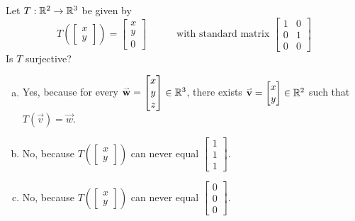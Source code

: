 \begin{activity}{3}
Let $T: \mathbb{R}^2 \rightarrow \mathbb{R}^3$ be given by
\[
  T\left(\begin{bmatrix}x \\ y \end{bmatrix} \right)
    =
  \begin{bmatrix} x \\ y \\ 0 \end{bmatrix}
    \hspace{3em}
    \text{with standard matrix }
  \begin{bmatrix} 1 & 0 \\ 0 & 1 \\ 0 & 0 \end{bmatrix}
\]
Is \(T\) surjective?
\begin{enumerate}[a)]
\item Yes, because for every \(\mathbf{\accentset{\rightharpoonup}{w}}=\begin{bmatrix}x\\y\\z\end{bmatrix}\in\mathbb{R}^3\),
there exists \(\mathbf{\accentset{\rightharpoonup}{v}}=\begin{bmatrix}x\\y\end{bmatrix}\in\mathbb{R}^2\) such that
\(T(\vec v)=\vec w\).
\item No, because 
  \(
    T\left(\begin{bmatrix}x\\y\end{bmatrix}\right)
  \)
can never equal
  \(
  \begin{bmatrix} 1 \\ 1 \\ 1 \end{bmatrix}
  \).
\item No, because 
  \(
    T\left(\begin{bmatrix}x\\y\end{bmatrix}\right)
  \)
can never equal
  \(
  \begin{bmatrix} 0 \\ 0 \\ 0 \end{bmatrix}
  \).
\end{enumerate}
\end{activity}


